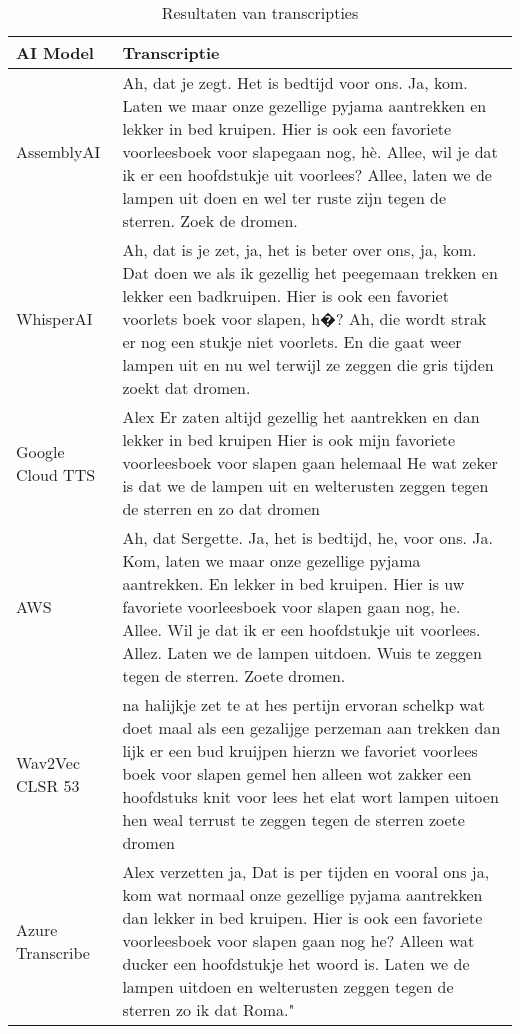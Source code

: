 \begin{table}[htbp]
    \centering
    \label{tab:results_sample2}
    \begin{tabularx}{\textwidth}{|l|X|}
    \hline
    \textbf{AI Model} & \textbf{Transcriptie} \\ \midrule
    
    AssemblyAI & Ah, dat je zegt. Het is bedtijd voor ons. Ja, kom. Laten we maar onze gezellige pyjama aantrekken en lekker in bed kruipen. Hier is ook een favoriete voorleesboek voor slapegaan nog, hè. Allee, wil je dat ik er een hoofdstukje uit voorlees? Allee, laten we de lampen uit doen en wel ter ruste zijn tegen de sterren. Zoek de dromen.
    \\ \hline
    
    WhisperAI &  Ah, dat is je zet, ja, het is beter over ons, ja, kom. Dat doen we als ik gezellig het peegemaan trekken en lekker een badkruipen. Hier is ook een favoriet voorlets boek voor slapen, h�? Ah, die wordt strak er nog een stukje niet voorlets. En die gaat weer lampen uit en nu wel terwijl ze zeggen die gris tijden zoekt dat dromen.
    
    \\ \hline
    
    Google Cloud TTS &    Alex Er zaten altijd gezellig het aantrekken en dan lekker in bed kruipen Hier is ook mijn favoriete voorleesboek voor slapen gaan helemaal He wat zeker is dat we de lampen uit en welterusten zeggen tegen de sterren en zo dat dromen
    
    \\ \hline
    
    AWS &      Ah, dat Sergette. Ja, het is bedtijd, he, voor ons. Ja. Kom, laten we maar onze gezellige pyjama aantrekken. En lekker in bed kruipen. Hier is uw favoriete voorleesboek voor slapen gaan nog, he. Allee. Wil je dat ik er een hoofdstukje uit voorlees. Allez. Laten we de lampen uitdoen. Wuis te zeggen tegen de sterren. Zoete dromen.
    
    \\ \hline
    
    Wav2Vec CLSR 53 &     na halijkje zet te at hes pertijn ervoran schelkp wat doet maal als een gezalijge perzeman aan trekken dan lijk er een bud kruijpen hierzn we favoriet voorlees boek voor slapen gemel hen alleen wot zakker een hoofdstuks knit voor lees het elat wort lampen uitoen hen weal terrust te zeggen tegen de sterren zoete dromen
    
    \\ \hline
    
    Azure Transcribe &   Alex verzetten ja, Dat is per tijden en vooral ons ja, kom wat normaal onze gezellige pyjama aantrekken dan lekker in bed kruipen. Hier is ook een favoriete voorleesboek voor slapen gaan nog he? Alleen wat ducker een hoofdstukje het woord is. Laten we de lampen uitdoen en welterusten zeggen tegen de sterren zo ik dat Roma."
    
    \\ \hline
\end{tabularx}
    \caption{Resultaten van transcripties}
\end{table}
\FloatBarrier

